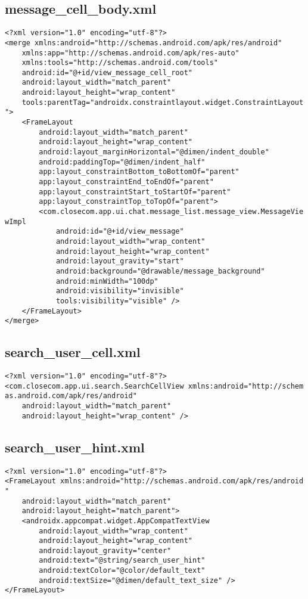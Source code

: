 \documentclass[listing]{espd}
\begin{document}
\subsection{message\_cell\_body.xml}
\begin{verbatim}
<?xml version="1.0" encoding="utf-8"?>
<merge xmlns:android="http://schemas.android.com/apk/res/android"
    xmlns:app="http://schemas.android.com/apk/res-auto"
    xmlns:tools="http://schemas.android.com/tools"
    android:id="@+id/view_message_cell_root"
    android:layout_width="match_parent"
    android:layout_height="wrap_content"
    tools:parentTag="androidx.constraintlayout.widget.ConstraintLayout
">
    <FrameLayout
        android:layout_width="match_parent"
        android:layout_height="wrap_content"
        android:layout_marginHorizontal="@dimen/indent_double"
        android:paddingTop="@dimen/indent_half"
        app:layout_constraintBottom_toBottomOf="parent"
        app:layout_constraintEnd_toEndOf="parent"
        app:layout_constraintStart_toStartOf="parent"
        app:layout_constraintTop_toTopOf="parent">
        <com.closecom.app.ui.chat.message_list.message_view.MessageVie
wImpl
            android:id="@+id/view_message"
            android:layout_width="wrap_content"
            android:layout_height="wrap_content"
            android:layout_gravity="start"
            android:background="@drawable/message_background"
            android:minWidth="100dp"
            android:visibility="invisible"
            tools:visibility="visible" />
    </FrameLayout>
</merge>
\end{verbatim}

\subsection{search\_user\_cell.xml}
\begin{verbatim}
<?xml version="1.0" encoding="utf-8"?>
<com.closecom.app.ui.search.SearchCellView xmlns:android="http://schem
as.android.com/apk/res/android"
    android:layout_width="match_parent"
    android:layout_height="wrap_content" />
\end{verbatim}

\subsection{search\_user\_hint.xml}
\begin{verbatim}
<?xml version="1.0" encoding="utf-8"?>
<FrameLayout xmlns:android="http://schemas.android.com/apk/res/android
"
    android:layout_width="match_parent"
    android:layout_height="match_parent">
    <androidx.appcompat.widget.AppCompatTextView
        android:layout_width="wrap_content"
        android:layout_height="wrap_content"
        android:layout_gravity="center"
        android:text="@string/search_user_hint"
        android:textColor="@color/default_text"
        android:textSize="@dimen/default_text_size" />
</FrameLayout>
\end{verbatim}
\end{document}
